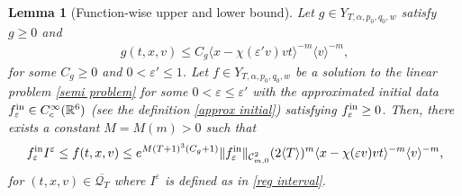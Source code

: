 \documentclass[reqno,11pt,final]{amsart}
\theoremstyle{plain}
\newtheorem{lemma}[theorem]{Lemma}
\numberwithin{equation}{section}
\numberwithin{theorem}{section}
\begin{document}
\begin{lemma}[Function-wise upper and lower bound]\label{local comparison} Let $g \in Y_{T,\alpha,p_0,q_0,w}$ satisfy $g\ge0$ and
\begin{align*}
 g(t,x,v) \le C_g\langle x-\chi(\varepsilon' v)vt \rangle^{-m}\langle v\rangle^{-m},
\end{align*}for some $C_g\ge 0$ and $0<\varepsilon'\le 1$. Let $f\in Y_{T,\alpha,p_0,q_0,w}$ be a solution to the linear problem \eqref{semi problem} for some $0<\varepsilon\le \varepsilon'$ with the approximated initial data $f^\textup{in}_\varepsilon\in C^\infty_c(\mathbb{R}^6)$ (see the definition \eqref{approx initial}) satisfying $f^\textup{in}_\varepsilon\ge0$. Then, there exists a constant $M=M(m)>0$ such that
\begin{align*}
 f^\textup{in}_\varepsilon I^\varepsilon\le f(t,x,v) \le e^{M(T+1)^3(C_g+1)}\lVert f^\textup{in}_\varepsilon\rVert_{\mathcal{C}^2_{m,0}}(2\langle T\rangle)^m\langle x -\chi(\varepsilon v)vt\rangle^{-m} \langle v\rangle^{-m},
\end{align*} for $(t,x,v)\in\overline{\mathcal{Q}_T}$ where $I^\varepsilon$ is defined as in \eqref{reg interval}.
\end{lemma}
\end{document}
